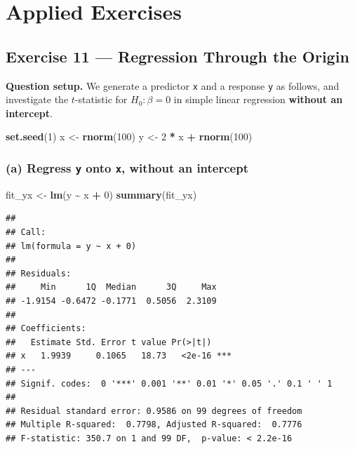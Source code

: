 \documentclass[
  11pt,
]{article}
\newenvironment{Shaded}{\begin{snugshade}}{\end{snugshade}}
\newcommand{\DecValTok}[1]{\textcolor[rgb]{0.00,0.00,0.81}{#1}}
\newcommand{\FunctionTok}[1]{\textcolor[rgb]{0.13,0.29,0.53}{\textbf{#1}}}
\newcommand{\NormalTok}[1]{#1}
\newcommand{\OtherTok}[1]{\textcolor[rgb]{0.56,0.35,0.01}{#1}}
\newcommand{\SpecialCharTok}[1]{\textcolor[rgb]{0.81,0.36,0.00}{\textbf{#1}}}
\begin{document}
\newpage

\section{Applied Exercises}\label{applied-exercises}

\subsection{Exercise 11 --- Regression Through the
Origin}\label{exercise-11-regression-through-the-origin}

\textbf{Question setup.} We generate a predictor \texttt{x} and a
response \texttt{y} as follows, and investigate the \(t\)-statistic for
\(H_0: \beta = 0\) in simple linear regression \textbf{without an
intercept}.

\begin{Shaded}
\begin{Highlighting}[]
\FunctionTok{set.seed}\NormalTok{(}\DecValTok{1}\NormalTok{)}
\NormalTok{x }\OtherTok{\textless{}{-}} \FunctionTok{rnorm}\NormalTok{(}\DecValTok{100}\NormalTok{)}
\NormalTok{y }\OtherTok{\textless{}{-}} \DecValTok{2} \SpecialCharTok{*}\NormalTok{ x }\SpecialCharTok{+} \FunctionTok{rnorm}\NormalTok{(}\DecValTok{100}\NormalTok{)}
\end{Highlighting}
\end{Shaded}

\subsubsection{\texorpdfstring{(a) Regress \texttt{y} onto \texttt{x},
without an
intercept}{(a) Regress y onto x, without an intercept}}\label{a-regress-y-onto-x-without-an-intercept}

\begin{Shaded}
\begin{Highlighting}[]
\NormalTok{fit\_yx }\OtherTok{\textless{}{-}} \FunctionTok{lm}\NormalTok{(y }\SpecialCharTok{\textasciitilde{}}\NormalTok{ x }\SpecialCharTok{+} \DecValTok{0}\NormalTok{)}
\FunctionTok{summary}\NormalTok{(fit\_yx)}
\end{Highlighting}
\end{Shaded}

\begin{verbatim}
## 
## Call:
## lm(formula = y ~ x + 0)
## 
## Residuals:
##     Min      1Q  Median      3Q     Max 
## -1.9154 -0.6472 -0.1771  0.5056  2.3109 
## 
## Coefficients:
##   Estimate Std. Error t value Pr(>|t|)    
## x   1.9939     0.1065   18.73   <2e-16 ***
## ---
## Signif. codes:  0 '***' 0.001 '**' 0.01 '*' 0.05 '.' 0.1 ' ' 1
## 
## Residual standard error: 0.9586 on 99 degrees of freedom
## Multiple R-squared:  0.7798, Adjusted R-squared:  0.7776 
## F-statistic: 350.7 on 1 and 99 DF,  p-value: < 2.2e-16
\end{verbatim}
\end{document}
